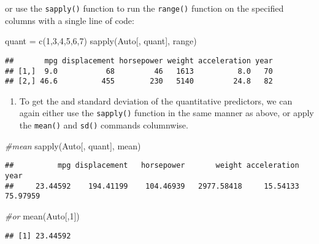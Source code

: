 \documentclass[
]{article}
\newenvironment{Shaded}{\begin{snugshade}}{\end{snugshade}}
\newcommand{\CommentTok}[1]{\textcolor[rgb]{0.56,0.35,0.01}{\textit{#1}}}
\newcommand{\DecValTok}[1]{\textcolor[rgb]{0.00,0.00,0.81}{#1}}
\newcommand{\FunctionTok}[1]{\textcolor[rgb]{0.00,0.00,0.00}{#1}}
\newcommand{\NormalTok}[1]{#1}
\newcommand{\OtherTok}[1]{\textcolor[rgb]{0.56,0.35,0.01}{#1}}
\providecommand{\tightlist}{%
  \setlength{\itemsep}{0pt}\setlength{\parskip}{0pt}}
\begin{document}
or use the \texttt{sapply()} function to run the \texttt{range()}
function on the specified columns with a single line of code:

\begin{Shaded}
\begin{Highlighting}[]
\NormalTok{quant }\OtherTok{=} \FunctionTok{c}\NormalTok{(}\DecValTok{1}\NormalTok{,}\DecValTok{3}\NormalTok{,}\DecValTok{4}\NormalTok{,}\DecValTok{5}\NormalTok{,}\DecValTok{6}\NormalTok{,}\DecValTok{7}\NormalTok{)}
\FunctionTok{sapply}\NormalTok{(Auto[, quant], range)}
\end{Highlighting}
\end{Shaded}

\begin{verbatim}
##       mpg displacement horsepower weight acceleration year
## [1,]  9.0           68         46   1613          8.0   70
## [2,] 46.6          455        230   5140         24.8   82
\end{verbatim}

\begin{enumerate}
\def\labelenumi{\alph{enumi})}
\setcounter{enumi}{2}
\tightlist
\item
  To get the and standard deviation of the quantitative predictors, we
  can again either use the \texttt{sapply()} function in the same manner
  as above, or apply the \texttt{mean()} and \texttt{sd()} commands
  columnwise.
\end{enumerate}

\begin{Shaded}
\begin{Highlighting}[]
\CommentTok{\#mean}
\FunctionTok{sapply}\NormalTok{(Auto[, quant], mean)}
\end{Highlighting}
\end{Shaded}

\begin{verbatim}
##          mpg displacement   horsepower       weight acceleration         year 
##     23.44592    194.41199    104.46939   2977.58418     15.54133     75.97959
\end{verbatim}

\begin{Shaded}
\begin{Highlighting}[]
\CommentTok{\#or}
\FunctionTok{mean}\NormalTok{(Auto[,}\DecValTok{1}\NormalTok{])}
\end{Highlighting}
\end{Shaded}

\begin{verbatim}
## [1] 23.44592
\end{verbatim}
\end{document}

